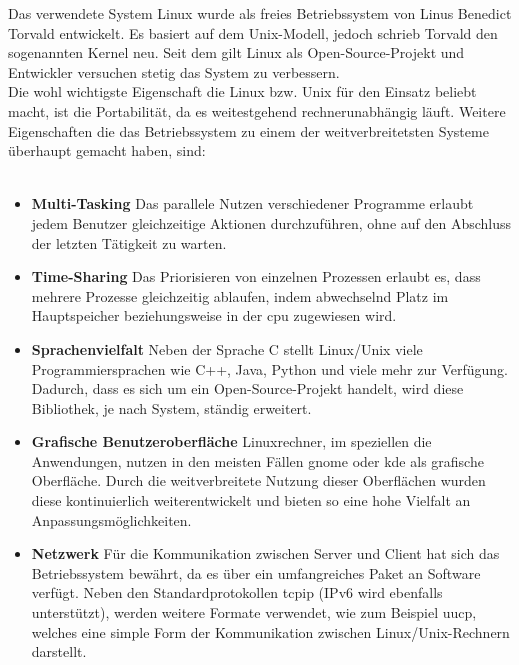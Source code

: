 Das verwendete System Linux wurde als freies Betriebssystem von Linus Benedict Torvald entwickelt.
Es basiert auf dem Unix-Modell, jedoch schrieb Torvald den sogenannten Kernel neu. Seit dem gilt
Linux als Open-Source-Projekt und Entwickler versuchen stetig das System zu verbessern.\cite{linux}\\
Die wohl wichtigste Eigenschaft die Linux bzw. Unix für den Einsatz beliebt macht, ist die Portabilität,
da es weitestgehend rechnerunabhängig läuft. Weitere Eigenschaften die das Betriebssystem zu einem der
 weitverbreitetsten Systeme überhaupt gemacht haben, sind:\\\cite{linux}\\
\begin{itemize}
\item  \textbf{Multi-Tasking} Das parallele Nutzen verschiedener Programme erlaubt jedem Benutzer
        gleichzeitige Aktionen durchzuführen, ohne auf den Abschluss der letzten Tätigkeit zu warten.
\item  \textbf{Time-Sharing} Das Priorisieren von einzelnen Prozessen erlaubt es, dass mehrere
        Prozesse gleichzeitig ablaufen, indem abwechselnd Platz im Hauptspeicher beziehungsweise in der \ac{cpu}
        zugewiesen wird.
\item \textbf{Sprachenvielfalt} Neben der Sprache C stellt Linux/Unix viele Programmiersprachen
      wie C++, Java, Python und viele mehr zur Verfügung. Dadurch, dass es sich um ein Open-Source-Projekt handelt,
      wird diese Bibliothek, je nach System, ständig erweitert.
\item \textbf{Grafische Benutzeroberfläche} Linuxrechner, im speziellen die Anwendungen, nutzen in
      den meisten Fällen \ac{gnome} oder \ac{kde} als grafische Oberfläche. Durch die weitverbreitete Nutzung
      dieser Oberflächen wurden diese kontinuierlich weiterentwickelt und bieten so eine hohe Vielfalt an
      Anpassungsmöglichkeiten.
\item \textbf{Netzwerk} Für die Kommunikation zwischen Server und Client hat sich das Betriebssystem bewährt,
      da es über ein umfangreiches Paket an Software verfügt. Neben den Standardprotokollen \ac{tcpip} (IPv6 wird
      ebenfalls unterstützt), werden weitere Formate verwendet, wie zum Beispiel \ac{uucp}, welches eine simple Form
      der Kommunikation zwischen Linux/Unix-Rechnern darstellt.
\end{itemize}

